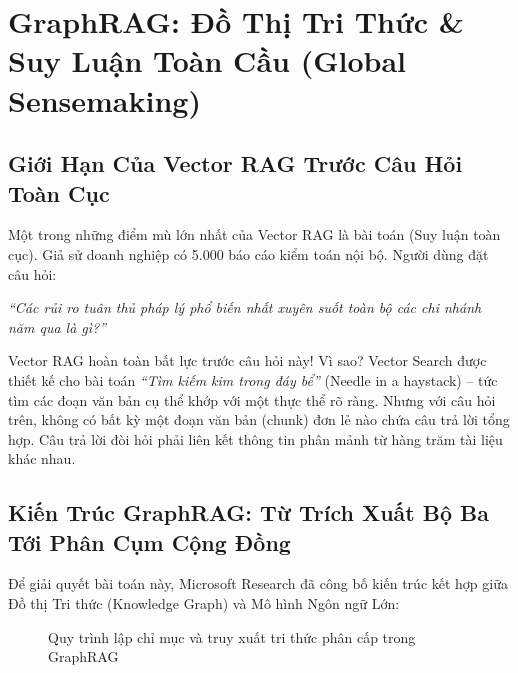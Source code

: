 \section{GraphRAG: Đồ Thị Tri Thức \& Suy Luận Toàn Cầu (Global Sensemaking)}
\label{sec:graph-rag}

\subsection{Giới Hạn Của Vector RAG Trước Câu Hỏi Toàn Cục}
Một trong những điểm mù lớn nhất của Vector RAG là bài toán  (Suy luận toàn cục).
Giả sử doanh nghiệp có 5.000 báo cáo kiểm toán nội bộ. Người dùng đặt câu hỏi:
\begin{center}
\textit{``Các rủi ro tuân thủ pháp lý phổ biến nhất xuyên suốt toàn bộ các chi nhánh năm qua là gì?''}
\end{center}
Vector RAG hoàn toàn bất lực trước câu hỏi này! Vì sao?
Vector Search được thiết kế cho bài toán \textit{``Tìm kiếm kim trong đáy bể''} (Needle in a haystack) -- tức tìm các đoạn văn bản cụ thể khớp với một thực thể rõ ràng. Nhưng với câu hỏi trên, không có bất kỳ một đoạn văn bản (chunk) đơn lẻ nào chứa câu trả lời tổng hợp. Câu trả lời đòi hỏi phải liên kết thông tin phân mảnh từ hàng trăm tài liệu khác nhau.

\subsection{Kiến Trúc GraphRAG: Từ Trích Xuất Bộ Ba Tới Phân Cụm Cộng Đồng}
Để giải quyết bài toán này, Microsoft Research đã công bố kiến trúc  kết hợp giữa Đồ thị Tri thức (Knowledge Graph) và Mô hình Ngôn ngữ Lớn:

\begin{figure}[htbp]
\centering
{}
\caption{Quy trình lập chỉ mục và truy xuất tri thức phân cấp trong GraphRAG}
\label{fig:graph-rag-pipeline}
\end{figure}

